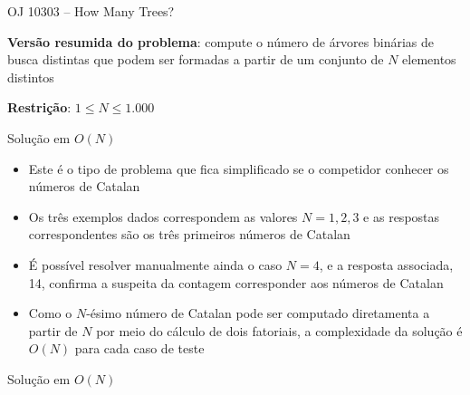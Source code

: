 \begin{frame}[fragile]{OJ 10303 -- How Many Trees?}

    \textbf{Versão resumida do problema}: compute o número de árvores binárias de busca
        distintas que podem ser formadas a partir de um conjunto de $N$ elementos distintos
            
    \vspace{0.1in}

    \textbf{Restrição}: $1\leq N\leq 1.000$
\end{frame}

\begin{frame}[fragile]{Solução em $O(N)$}

    \begin{itemize}
        \item Este é o tipo de problema que fica simplificado se o competidor conhecer os
            números de Catalan

        \item Os três exemplos dados correspondem as valores $N = 1, 2, 3$ e as respostas
            correspondentes são os três primeiros números de Catalan

        \item É possível resolver manualmente ainda o caso $N = 4$, e a resposta associada, 14,
            confirma a suspeita da contagem corresponder aos números de Catalan

        \item Como o $N$-ésimo número de Catalan pode ser computado diretamenta a partir de $N$
            por meio do cálculo de dois fatoriais, a complexidade da solução é $O(N)$ para cada
            caso de teste
    \end{itemize}

\end{frame}

\begin{frame}[fragile]{Solução em $O(N)$}
\end{frame}

